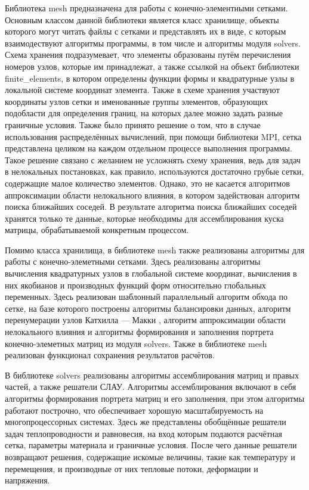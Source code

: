 Библиотека mesh предназначена для работы с конечно-элементными сетками. Основным классом данной библиотеки является класс хранилище, объекты которого могут читать файлы с сетками и представлять их в виде, с которым взаимодествуют алгоритмы программы, в том числе и алгоритмы модуля solvers. Схема хранения подразумевает, что элементы образованы путём перечисления номеров узлов, которые им принадлежат, а также ссылкой на объект библиотеки finite\_elements, в котором определены функции формы и квадратурные узлы в локальной системе координат элемента. Также в схеме хранения участвуют координаты узлов сетки и именованные группы элементов, образующих подобласти для определения границ, на которых далее можно задать разные граничные условия. Также было принято решение о том, что в случае использования распределённых вычислений, при помощи библиотеки MPI, сетка представлена целиком на каждом отдельном процессе выполнения программы. Такое решение связано с желанием не усложнять схему хранения, ведь для задач в нелокальных постановках, как правило, используются достаточно грубые сетки, содержащие малое количество элементов. Однако, это не касается алгоритмов аппроксимации области нелокального влияния, в котором задействован алгоритм поиска ближайших соседей. В результате алгоритма поиска ближайших соседей хранятся только те данные, которые необходимы для ассемблирования куска матрицы, обрабатываемой конкретным процессом.

Помимо класса хранилища, в библиотеке mesh также реализованы алгоритмы для работы с конечно-элеметными сетками. Здесь реализованы алгоритмы вычисления квадратурных узлов в глобальной системе координат, вычисления в них якобианов и производных функций форм относительно глобальных переменных. Здесь реализован шаблонный параллельный алгоритм обхода по сетке, на базе которого построены алгоритмы балансировки данных, алгоритм перенумерации узлов Катхилла --- Макки \cite{CuthillMcKee}, алгоритм аппроксимации области нелокального влияния и алгоритмы формирования и заполнения портрета конечно-элеметных матриц из модуля solvers. Также в библиотеке mesh реализован функционал сохранения результатов расчётов.

В библиотеке solvers реализованы алгоритмы ассемблирования матриц и правых частей, а также решатели СЛАУ. Алгоритмы ассемблирования включают в себя алгоритмы формирования портрета матриц и его заполнения, при этом алгоритмы работают построчно, что обеспечивает хорошую масштабируемость на многопроцессорных системах. Здесь же представлены обобщённые решатели задач теплопроводности и равновесия, на вход которым подаются расчётная сетка, параметры материала и граничные условия. После чего данные решатели возвращают решения, содержащие искомые величины, такие как температуру и перемещения, и производные от них тепловые потоки, деформации и напряжения.

